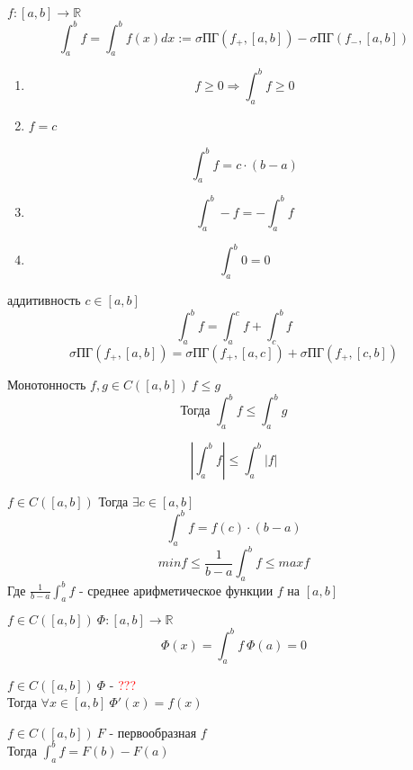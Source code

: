 \documentclass[12pt]{article}
\begin{document}
\begin{definition}
  $f: [a, b] \rightarrow \mathbb{R}$ \\
  $$\int_a^bf=\int_a^bf(x)dx := \sigma \textrm{ПГ}(f_+,[a,b])-\sigma \textrm{ПГ}(f_-, [a,b])$$
\end{definition}
\begin{note}
  \hfill \break
  \begin{enumerate}
  \item $$f \ge 0 \Rightarrow \int_a^bf \ge 0$$
  \item $f = c$ \\\
    $$\int_a^bf = c \cdot (b - a)$$
  \item $$\int_a^b-f = -\int_a^bf$$
  \item $$\int_a^b0 = 0$$
  \end{enumerate}
\end{note}
\begin{features}
  \item аддитивность $c \in [a, b]$ \\
    $$\int_a^bf = \int_a^cf + \int_c^bf$$
    $$\sigma \textrm{ПГ}(f_+, [a, b]) = \sigma \textrm{ПГ}(f_+, [a, c]) + \sigma \textrm{ПГ}(f_+, [c, b])$$
  \item Монотонность $f, g \in C([a, b])\ f \le g$ \\
    $$\textrm{Тогда } \int_a^bf \le \int_a^bg$$
  \item $$\left| \int_a^b f \right| \le \int_a^b\left| f \right|$$
\end{features}
\begin{theorem}[О среднем]
  $f \in C([a, b])$ Тогда $\exists c \in [a, b]$
  $$\int_a^bf = f(c) \cdot (b - a)$$
  $$min f \le \frac{1}{b-a}\int_a^bf \le max f$$
  Где $\frac{1}{b-a}\int_a^bf$ - среднее арифметическое функции $f$ на $[a, b]$ 
\end{theorem}
\begin{definition}
  $f \in C([a, b])\ \Phi: [a,b] \rightarrow \mathbb{R}$
  $$\Phi(x) = \int_a^bf\ \Phi(a) = 0$$
\end{definition}
\begin{theorem}[Барроу]
  $f \in C([a, b])\ \Phi$ - \textcolor{red}{???} \\
  Тогда $\forall x \in [a, b]\ \Phi'(x) = f(x)$
\end{theorem}
\begin{theorem}
  $f \in C([a, b])\ F$ - первообразная $f$ \\
  Тогда $\int_a^bf=F(b) - F(a)$
\end{theorem}
\end{document}
